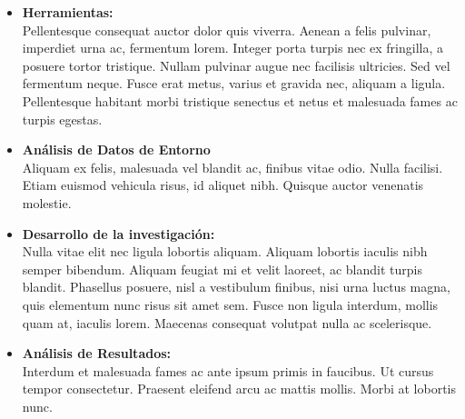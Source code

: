 \begin{itemize}
\item \textbf{Herramientas:} \\
Pellentesque consequat auctor dolor quis viverra. Aenean a felis pulvinar, imperdiet urna ac, fermentum lorem. Integer porta turpis nec ex fringilla, a posuere tortor tristique. Nullam pulvinar augue nec facilisis ultricies. Sed vel fermentum neque. Fusce erat metus, varius et gravida nec, aliquam a ligula. Pellentesque habitant morbi tristique senectus et netus et malesuada fames ac turpis egestas. 


\item \textbf{Análisis de Datos de Entorno} \\
Aliquam ex felis, malesuada vel blandit ac, finibus vitae odio. Nulla facilisi. Etiam euismod vehicula risus, id aliquet nibh. Quisque auctor venenatis molestie.  

\item \textbf{Desarrollo de la investigación:} \\
Nulla vitae elit nec ligula lobortis aliquam. Aliquam lobortis iaculis nibh semper bibendum. Aliquam feugiat mi et velit laoreet, ac blandit turpis blandit. Phasellus posuere, nisl a vestibulum finibus, nisi urna luctus magna, quis elementum nunc risus sit amet sem. Fusce non ligula interdum, mollis quam at, iaculis lorem. Maecenas consequat volutpat nulla ac scelerisque. 

\item \textbf{Análisis de Resultados:} \\
Interdum et malesuada fames ac ante ipsum primis in faucibus. Ut cursus tempor consectetur. Praesent eleifend arcu ac mattis mollis. Morbi at lobortis nunc.


\end{itemize}
